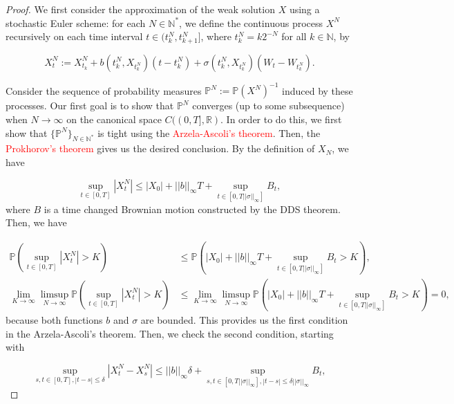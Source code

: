 \documentclass{article}
\begin{document}
\begin{proof}
We first consider the approximation of the weak solution $X$ using a stochastic Euler scheme: for each $N\in\mathbb{N}^*$, we define the continuous process $X^N$ recursively on each time interval $t\in(t^N_k,t^N_{k+1}]$, where $t_k^N=k2^{-N}$ for all $k\in\mathbb{N}$, by

\begin{equation*}
X_t^N:=X_{t_k}^N+b(t_k^N,X_{t_k^N})(t-t_k^N)+\sigma(t_k^N,X_{t_k^N})(W_t-W_{t_k^N}).
\end{equation*}

Consider the sequence of probability measures $\mathbb{P}^N:=\mathbb{P}(X^N)^{-1}$ induced by these processes. Our first goal is to show that $\mathbb{P}^N$ converges (up to some subsequence) when $N\rightarrow\infty$ on the canonical space $C((0,T],\mathbb{R})$. In order to do this, we first show that $\{\mathbb{P}^N\}_{N\in\mathbb{N}^*}$ is tight using the \textcolor{red}{Arzela-Ascoli's theorem}. Then, the \textcolor{red}{Prokhorov's theorem} gives us the desired conclusion. By the definition of $X_N$, we have 

\begin{equation*}
\sup_{t\in[0,T]}|X_t^N|\leq|X_0|+||b||_\infty T+ \sup_{t\in[0,T||\sigma||_\infty]} B_t,
\end{equation*}
where $B$ is a time changed Brownian motion constructed by the DDS theorem. Then, we have 

\begin{equation*}
\begin{aligned}
\mathbb{P}\left(\sup_{t\in[0,T]}|X_t^N|>K\right)&\leq\mathbb{P}\left(|X_0|+||b||_\infty T+ \sup_{t\in[0,T||\sigma||_\infty]} B_t>K\right),\\
\lim_{K\rightarrow\infty}\limsup_{N\rightarrow\infty}\mathbb{P}\left(\sup_{t\in[0,T]}|X_t^N|>K\right)&\leq\lim_{K\rightarrow\infty}\limsup_{N\rightarrow\infty}\mathbb{P}\left(|X_0|+||b||_\infty T+ \sup_{t\in[0,T||\sigma||_\infty]} B_t>K\right)=0,
\end{aligned}
\end{equation*}
because both functions $b$ and $\sigma$ are bounded. This provides us the first condition in the Arzela-Ascoli's theorem. Then, we check the second condition, starting with 

\begin{equation*}
\sup_{s,t\in[0,T],|t-s|\leq\delta}|X_t^N-X_s^N|\leq||b||_\infty \delta+ \sup_{s,t\in[0,T||\sigma||_\infty],|t-s|\leq\delta||\sigma||_\infty} B_t,
\end{equation*}


\end{proof}
\end{document}
